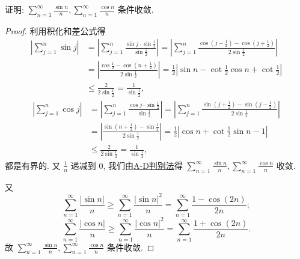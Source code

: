 \documentclass[../../main.tex]{subfiles}%
\begin{document}
\begin{example}
证明: $\sum_{n=1}^{\infty} \frac{\sin n}{n}, \sum_{n=1}^{\infty} \frac{\cos n}{n}$ 条件收敛.
\end{example}
\begin{proof}

利用积化和差公式得
\begin{align*}
\left| \sum_{j=1}^n{\sin j} \right|&=\left| \sum_{j=1}^n{\frac{\sin j\cdot \sin \frac{1}{2}}{\sin \frac{1}{2}}} \right|=\left| \sum_{j=1}^n{\frac{\cos \left( j-\frac{1}{2} \right) -\cos \left( j+\frac{1}{2} \right)}{2\sin \frac{1}{2}}} \right|
\\
&=\left| \frac{\cos \frac{1}{2}-\cos \left( n+\frac{1}{2} \right)}{2\sin \frac{1}{2}} \right|=\frac{1}{2}\left| \sin n-\cot \frac{1}{2}\cos n+\cot \frac{1}{2} \right|
\\
&\leqslant \frac{2}{2\sin \frac{1}{2}}=\frac{1}{\sin \frac{1}{2}},
\end{align*}
\begin{align*}
\left| \sum_{j=1}^n{\cos j} \right|&=\left| \sum_{j=1}^n{\frac{\cos j\cdot \sin \frac{1}{2}}{\sin \frac{1}{2}}} \right|=\left| \sum_{j=1}^n{\frac{\sin \left( j+\frac{1}{2} \right) -\sin \left( j-\frac{1}{2} \right)}{2\sin \frac{1}{2}}} \right|
\\
&=\left| \frac{\sin \left( n+\frac{1}{2} \right) -\sin \frac{1}{2}}{2\sin \frac{1}{2}} \right|=\frac{1}{2}\left| \cos n+\cot \frac{1}{2}\sin n-1 \right|
\\
&\leqslant \frac{2}{2\sin \frac{1}{2}}=\frac{1}{\sin \frac{1}{2}},
\end{align*}
都是有界的. 又 $\frac{1}{n}$ 递减到 0, 我们由\hyperref[theorem:A-D判别法]{A-D判别法}得 $\sum_{n=1}^{\infty} \frac{\sin n}{n}, \sum_{n=1}^{\infty} \frac{\cos n}{n}$ 收敛.

又
\[
\sum_{n=1}^{\infty} \frac{|\sin n|}{n} \geqslant \sum_{n=1}^{\infty} \frac{|\sin n|^2}{n} = \sum_{n=1}^{\infty} \frac{1 - \cos (2n)}{2n};
\]
\[
\sum_{n=1}^{\infty} \frac{|\cos n|}{n} \geqslant \sum_{n=1}^{\infty} \frac{|\cos n|^2}{n} = \sum_{n=1}^{\infty} \frac{1 + \cos (2n)}{2n}.
\]
故 $\sum_{n=1}^{\infty} \frac{\sin n}{n}, \sum_{n=1}^{\infty} \frac{\cos n}{n}$ 条件收敛.

\end{proof}
\end{document}
